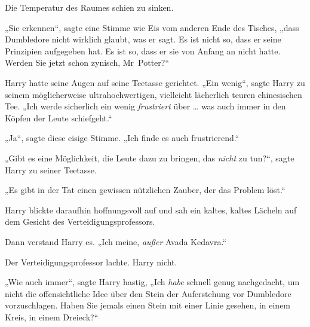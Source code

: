 Die Temperatur des Raumes schien zu sinken.

„Sie erkennen“, sagte eine Stimme wie Eis vom anderen Ende des Tisches, „dass Dumbledore nicht wirklich glaubt, was er sagt. Es ist nicht so, dass er seine Prinzipien aufgegeben hat. Es ist so, dass er sie von Anfang an nicht hatte. Werden Sie jetzt schon zynisch, Mr~Potter?“

Harry hatte seine Augen auf seine Teetasse gerichtet.
„Ein wenig“, sagte Harry zu seinem möglicherweise ultrahochwertigen, vielleicht lächerlich teuren chinesischen Tee.
„Ich werde sicherlich ein wenig \emph{frustriert} über … was auch immer in den Köpfen der Leute schiefgeht.“

„Ja“, sagte diese eisige Stimme.
„Ich finde es auch frustrierend.“

„Gibt es eine Möglichkeit, die Leute dazu zu bringen, das \emph{nicht} zu tun?“, sagte Harry zu seiner Teetasse.

„Es gibt in der Tat einen gewissen nützlichen Zauber, der das Problem löst.“

Harry blickte daraufhin hoffnungsvoll auf und sah ein kaltes, kaltes Lächeln auf dem Gesicht des Verteidigungsprofessors.

Dann verstand Harry es.
„Ich meine, \emph{außer} Avada Kedavra.“

Der Verteidigungsprofessor lachte. Harry nicht.

„Wie auch immer“, sagte Harry hastig,
„Ich \emph{habe} schnell genug nachgedacht, um nicht die offensichtliche Idee über den Stein der Auferstehung vor Dumbledore vorzuschlagen. Haben Sie jemals einen Stein mit einer Linie gesehen, in einem Kreis, in einem Dreieck?“


